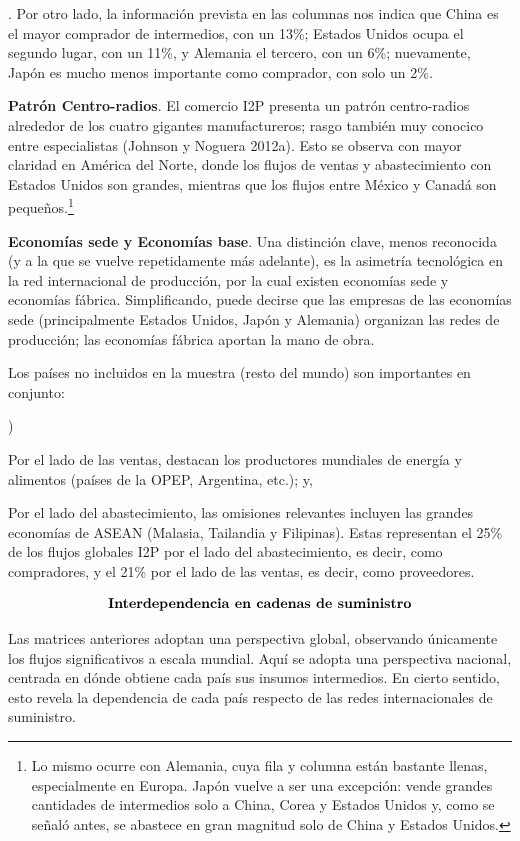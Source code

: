 \documentclass[10pt,a4paper]{article}
\newcounter{alphaitem}
\newcounter{numitem}
\newenvironment{la}
      {\begin{list}{\alph{alphaitem})}{%
          \usecounter{alphaitem}%
          \setlength{\leftmargin}{1cm}%
          \setlength{\parskip}{3pt}%
          \setlength{\itemsep}{0pt}%
          \setlength{\parsep}{0pt}%
      }}
      {\end{list}}
\newenvironment{lnum}
      {\begin{list}{\arabic{numitem}.}{%
          \usecounter{numitem}%
          \setlength{\leftmargin}{1cm}%
          \setlength{\parskip}{3pt}%
          \setlength{\itemsep}{0pt}%
          \setlength{\parsep}{0pt}%
      }}
      {\end{list}}
\begin{document}
\begin{lnum}
{    Por otro lado, la información prevista en las columnas nos indica que China es el mayor comprador de intermedios, con un 13\%; Estados Unidos ocupa el segundo lugar, con un 11\%, y Alemania el tercero, con un 6\%; nuevamente, Japón es mucho menos importante como comprador, con solo un 2\%.
    }
    \item \textbf{Patrón Centro-radios}. El comercio I2P presenta un patrón centro-radios alrededor de los cuatro gigantes manufactureros; rasgo también muy conocico entre especialistas (Johnson y Noguera 2012a). Esto se observa con mayor claridad en América del Norte, donde los flujos de ventas y abastecimiento con Estados Unidos son grandes, mientras que los flujos entre México y Canadá son pequeños.\footnote{%
        Lo mismo ocurre con Alemania, cuya fila y columna están bastante llenas, especialmente en Europa. Japón vuelve a ser una excepción: vende grandes cantidades de intermedios solo a China, Corea y Estados Unidos y, como se señaló antes, se abastece en gran magnitud solo de China y Estados Unidos.
    }
    \item \textbf{Economías sede y Economías base}. Una distinción clave, menos reconocida (y a la que se vuelve repetidamente más adelante), es la asimetría tecnológica en la red internacional de producción, por la cual existen economías sede y economías fábrica. Simplificando, puede decirse que las empresas de las economías sede (principalmente Estados Unidos, Japón y Alemania) organizan las redes de producción; las economías fábrica aportan la mano de obra.
    \item Los países no incluidos en la muestra (resto del mundo) son importantes en conjunto:
    \begin{la}
        \item Por el lado de las ventas, destacan los productores mundiales de energía y alimentos (países de la OPEP, Argentina, etc.); y,
        \item Por el lado del abastecimiento, las omisiones relevantes incluyen las grandes economías de ASEAN (Malasia, Tailandia y Filipinas). Estas representan el 25\% de los flujos globales I2P por el lado del abastecimiento, es decir, como compradores, y el 21\% por el lado de las ventas, es decir, como proveedores.
    \end{la}
\end{lnum}

$$\text{\textbf{Interdependencia en cadenas de suministro}}$$

Las matrices anteriores adoptan una perspectiva global, observando únicamente los flujos significativos a escala mundial. Aquí se adopta una perspectiva nacional, centrada en dónde obtiene cada país sus insumos intermedios. En cierto sentido, esto revela la dependencia de cada país respecto de las redes internacionales de suministro.
\end{document}
